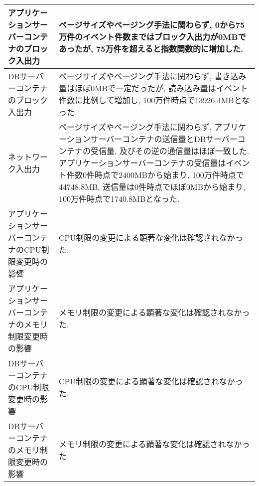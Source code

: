\documentclass[../../../main]{subfiles}
\begin{document}
\begin{table}[H]
\begin{tabular}{|p{4cm}|p{10cm}|}
            アプリケーションサーバーコンテナのブロック入出力     & ページサイズやページング手法に関わらず, 0から75万件のイベント件数まではブロック入出力が0MBであったが, 75万件を超えると指数関数的に増加した.                                                                                                                                                                        \\ \hline
            DBサーバーコンテナのブロック入出力           & ページサイズやページング手法に関わらず, 書き込み量はほぼ0MBで一定だったが, 読み込み量はイベント件数に比例して増加し, 100万件時点で13926.4MBとなった.                                                                                                                                                                \\ \hline
            ネットワーク入出力                    & ページサイズやページング手法に関わらず, アプリケーションサーバーコンテナの送信量とDBサーバーコンテナの受信量, 及びその逆の通信量はほぼ一致した. アプリケーションサーバーコンテナの受信量はイベント件数0件時点で2400MBから始まり, 100万件時点で44748.8MB, 送信量は0件時点でほぼ0MBから始まり, 100万件時点で1740.8MBとなった.                                                                  \\ \hline
            アプリケーションサーバーコンテナのCPU制限変更時の影響 & CPU制限の変更による顕著な変化は確認されなかった.                                                                                                                                                                                                                       \\ \hline
            アプリケーションサーバーコンテナのメモリ制限変更時の影響 & メモリ制限の変更による顕著な変化は確認されなかった.                                                                                                                                                                                                                       \\ \hline
            DBサーバーコンテナのCPU制限変更時の影響       & CPU制限の変更による顕著な変化は確認されなかった.                                                                                                                                                                                                                       \\ \hline
            DBサーバーコンテナのメモリ制限変更時の影響       & メモリ制限の変更による顕著な変化は確認されなかった.                                                                                                                                                                                                                       \\ \hline
        \end{tabular}
    \end{table}
\end{document}
